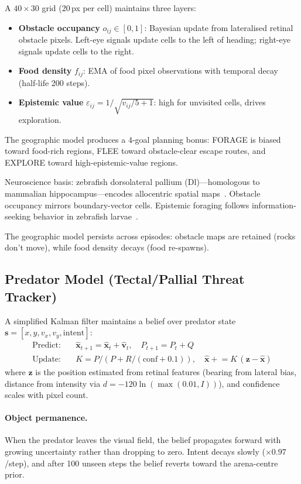 \documentclass[11pt,a4paper]{article}
\begin{document}
A $40 \times 30$ grid (20\,px per cell) maintains three layers:
\begin{itemize}[nosep]
  \item \textbf{Obstacle occupancy} $o_{ij} \in [0, 1]$:
    Bayesian update from lateralised retinal obstacle pixels.
    Left-eye signals update cells to the left of heading;
    right-eye signals update cells to the right.
  \item \textbf{Food density} $f_{ij}$: EMA of food pixel observations
    with temporal decay (half-life 200 steps).
  \item \textbf{Epistemic value} $\varepsilon_{ij} = 1/\sqrt{v_{ij}/5 + 1}$:
    high for unvisited cells, drives exploration.
\end{itemize}
The geographic model produces a 4-goal planning bonus: FORAGE is biased
toward food-rich regions, FLEE toward obstacle-clear escape routes,
and EXPLORE toward high-epistemic-value regions.

Neuroscience basis: zebrafish dorsolateral pallium (Dl)---homologous
to mammalian hippocampus---encodes allocentric spatial
maps~\cite{broglio2015}.  Obstacle occupancy mirrors boundary-vector
cells.  Epistemic foraging follows information-seeking behavior in
zebrafish larvae~\cite{dreosti2015}.

The geographic model persists across episodes: obstacle maps are retained
(rocks don't move), while food density decays (food re-spawns).

\subsection{Predator Model (Tectal/Pallial Threat Tracker)}

A simplified Kalman filter maintains a belief over predator state
$\mathbf{s} = [x, y, v_x, v_y, \text{intent}]$:
\begin{align}
  \text{Predict:}\quad & \hat{\mathbf{x}}_{t+1} = \hat{\mathbf{x}}_t + \hat{\mathbf{v}}_t, \quad
  P_{t+1} = P_t + Q \label{eq:pred_predict} \\
  \text{Update:}\quad & K = P / (P + R / (\text{conf} + 0.1)), \quad
  \hat{\mathbf{x}} \mathrel{+}= K\,(\mathbf{z} - \hat{\mathbf{x}}) \label{eq:pred_update}
\end{align}
where $\mathbf{z}$ is the position estimated from retinal features
(bearing from lateral bias, distance from intensity via
$d = -120\ln(\max(0.01, I))$), and confidence scales with pixel count.

\paragraph{Object permanence.}
When the predator leaves the visual field, the belief propagates forward
with growing uncertainty rather than dropping to zero.  Intent decays
slowly ($\times 0.97$/step), and after 100 unseen steps the belief
reverts toward the arena-centre prior.
\end{document}
